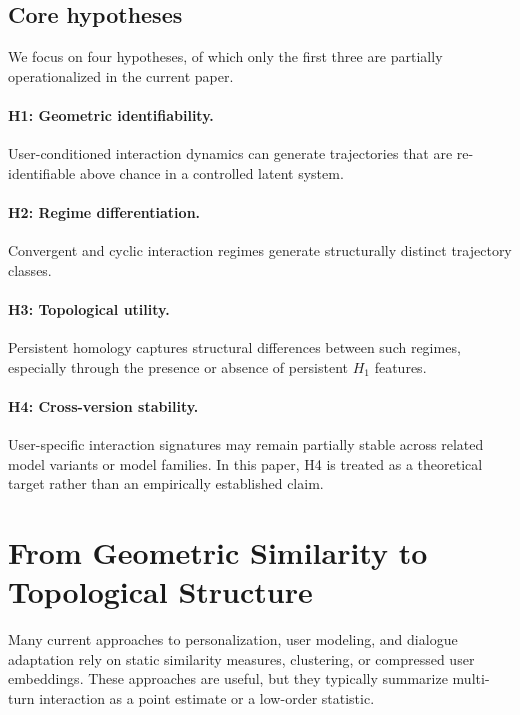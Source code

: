 \documentclass[11pt]{article}
\begin{document}
\subsection{Core hypotheses}

We focus on four hypotheses, of which only the first three are partially
operationalized in the current paper.

\paragraph{H1: Geometric identifiability.}
User-conditioned interaction dynamics can generate trajectories that are
re-identifiable above chance in a controlled latent system.

\paragraph{H2: Regime differentiation.}
Convergent and cyclic interaction regimes generate structurally distinct trajectory
classes.

\paragraph{H3: Topological utility.}
Persistent homology captures structural differences between such regimes, especially
through the presence or absence of persistent $H_1$ features.

\paragraph{H4: Cross-version stability.}
User-specific interaction signatures may remain partially stable across related
model variants or model families. In this paper, H4 is treated as a theoretical
target rather than an empirically established claim.


\section{From Geometric Similarity to Topological Structure}

Many current approaches to personalization, user modeling, and dialogue adaptation
rely on static similarity measures, clustering, or compressed user embeddings.
These approaches are useful, but they typically summarize multi-turn interaction as
a point estimate or a low-order statistic.
\end{document}
